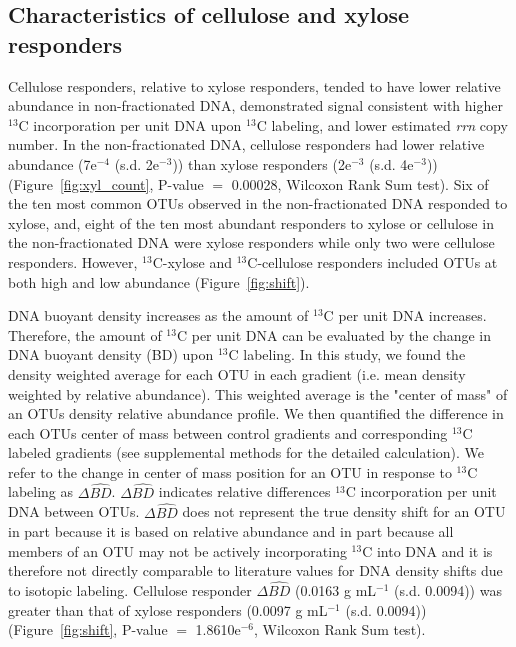 \subsection{Characteristics of cellulose and xylose responders}
Cellulose responders, relative to xylose responders, tended to have lower
relative abundance in non-fractionated DNA, demonstrated signal consistent
with higher $^{13}$C incorporation per unit DNA upon $^{13}$C labeling, and
lower estimated \textit{rrn} copy number. In the
non-fractionated DNA, cellulose responders had lower
relative abundance (7e$^{-4}$ (s.d. 2e$^{-3}$)) than xylose responders
(2e$^{-3}$ (s.d. 4e$^{-3}$)) (Figure~\ref{fig:xyl_count}, P-value $=$ 0.00028,
Wilcoxon Rank Sum test). Six of the ten most common OTUs observed in the
non-fractionated DNA responded to xylose, and, eight of the ten most
abundant responders to xylose or cellulose in the non-fractionated DNA
were xylose responders while only two were cellulose responders. However,
$^{13}$C-xylose and $^{13}$C-cellulose responders included OTUs at both
high and low abundance (Figure~\ref{fig:shift}).

DNA buoyant density increases as the amount of $^{13}$C per unit DNA increases.
Therefore, the amount of $^{13}$C per unit DNA can be evaluated by the change
in DNA buoyant density (BD) upon $^{13}$C labeling. In this study, we found the
density weighted average for each OTU in each gradient (i.e. mean density
weighted by relative abundance). This weighted average is the "center of mass"
of an OTUs density relative abundance profile. We then quantified the
difference in each OTUs center of mass between control gradients and
corresponding $^{13}$C labeled gradients (see supplemental methods for the
detailed calculation). We refer to the change in center of mass position for an
OTU in response to $^{13}$C labeling as $\Delta\hat{BD}$. $\Delta\hat{BD}$
indicates relative differences $^{13}$C incorporation per unit DNA between
OTUs. $\Delta\hat{BD}$ does not represent the true density shift for an OTU in
part because it is based on relative abundance and in part because all members
of an OTU may not be actively incorporating $^{13}$C into DNA and it is
therefore not directly comparable to literature values for DNA density shifts
due to isotopic labeling. Cellulose responder $\Delta\hat{BD}$ (0.0163
g mL$^{-1}$ (s.d. 0.0094)) was greater than that of xylose responders (0.0097
g mL$^{-1}$ (s.d. 0.0094)) (Figure~\ref{fig:shift}, P-value $=$
1.8610e$^{-6}$, Wilcoxon Rank Sum test). 

